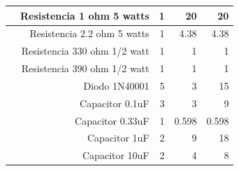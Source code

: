 \begin{landscape}
\begin{longtable}{|r|r|r|l|r|}
\cmidrule{Energético}    \rowcolor[rgb]{ .851,  .851,  .851}       & \multicolumn{1}{p{16.43em}|}{\cellcolor[rgb]{ 1,  1,  1}Resistencia 1 ohm 5 watts} & \cellcolor[rgb]{ 1,  1,  1}1 & \multicolumn{1}{r|}{\cellcolor[rgb]{ 1,  1,  1}20}&\cellcolor[rgb]{ 1,  1,  1}20 \\
\hline
\cmidrule{Energético}    \rowcolor[rgb]{ .851,  .851,  .851}       & \multicolumn{1}{p{16.43em}|}{\cellcolor[rgb]{ 1,  1,  1}Resistencia 2.2 ohm 5 watts} & \cellcolor[rgb]{ 1,  1,  1}1 & \multicolumn{1}{r|}{\cellcolor[rgb]{ 1,  1,  1}4.38} &\cellcolor[rgb]{ 1,  1,  1}4.38 \\
\hline
\cmidrule{Energético}    \rowcolor[rgb]{ .851,  .851,  .851}       & \multicolumn{1}{p{16.43em}|}{\cellcolor[rgb]{ 1,  1,  1}Resistencia 330 ohm 1/2 watt} & \cellcolor[rgb]{ 1,  1,  1}1 & \multicolumn{1}{r|}{\cellcolor[rgb]{ 1,  1,  1}1} & \cellcolor[rgb]{ 1,  1,  1}1 \\
\hline
\cmidrule{Energético}    \rowcolor[rgb]{ .851,  .851,  .851}       & \multicolumn{1}{p{16.43em}|}{\cellcolor[rgb]{ 1,  1,  1}Resistencia 390 ohm 1/2 watt} & \cellcolor[rgb]{ 1,  1,  1}1 & \multicolumn{1}{r|}{\cellcolor[rgb]{ 1,  1,  1}1} & \cellcolor[rgb]{ 1,  1,  1}1 \\
\hline
\cmidrule{Energético}    \rowcolor[rgb]{ .851,  .851,  .851}       & \multicolumn{1}{p{16.43em}|}{\cellcolor[rgb]{ 1,  1,  1}Diodo 1N40001} & \cellcolor[rgb]{ 1,  1,  1}5 & \multicolumn{1}{r|}{\cellcolor[rgb]{ 1,  1,  1}3} & \cellcolor[rgb]{ 1,  1,  1}15 \\
\hline
\cmidrule{Energético}    \rowcolor[rgb]{ .851,  .851,  .851}       & \multicolumn{1}{p{16.43em}|}{\cellcolor[rgb]{ 1,  1,  1}Capacitor 0.1uF} & \cellcolor[rgb]{ 1,  1,  1}3 & \multicolumn{1}{r|}{\cellcolor[rgb]{ 1,  1,  1}3} & \cellcolor[rgb]{ 1,  1,  1}9 \\
\hline
\cmidrule{Energético}    \rowcolor[rgb]{ .851,  .851,  .851}       & \multicolumn{1}{p{16.43em}|}{\cellcolor[rgb]{ 1,  1,  1}Capacitor 0.33uF} & \cellcolor[rgb]{ 1,  1,  1}1 & \multicolumn{1}{r|}{\cellcolor[rgb]{ 1,  1,  1}\textcolor[rgb]{ .2,  .2,  .2}{0.598}} & \cellcolor[rgb]{ 1,  1,  1}0.598 \\
\hline
\cmidrule{Energético}    \rowcolor[rgb]{ .851,  .851,  .851}       & \multicolumn{1}{p{16.43em}|}{\cellcolor[rgb]{ 1,  1,  1}Capacitor 1uF} & \cellcolor[rgb]{ 1,  1,  1}2 & \multicolumn{1}{r|}{\cellcolor[rgb]{ 1,  1,  1}9} & \cellcolor[rgb]{ 1,  1,  1}18 \\
\hline
\cmidrule{Energético}    \rowcolor[rgb]{ .851,  .851,  .851}       & \multicolumn{1}{p{16.43em}|}{\cellcolor[rgb]{ 1,  1,  1}Capacitor 10uF} & \cellcolor[rgb]{ 1,  1,  1}2 & \multicolumn{1}{r|}{\cellcolor[rgb]{ 1,  1,  1}4} & \cellcolor[rgb]{ 1,  1,  1}8 \\

\end{longtable}
\end{landscape}
